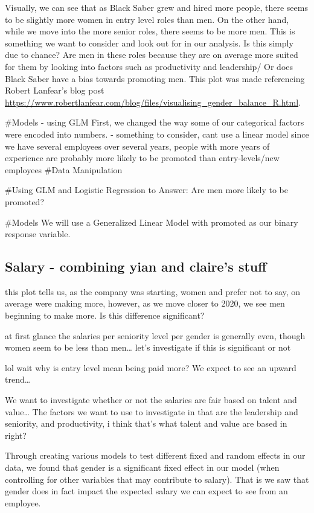 \documentclass[
          english,
          paper=a4,
              ,captions=tableheading
  ]{scrartcl}
\begin{document}
Visually, we can see that as Black Saber grew and hired more people,
there seems to be slightly more women in entry level roles than men. On
the other hand, while we move into the more senior roles, there seems to
be more men. This is something we want to consider and look out for in
our analysis. Is this simply due to chance? Are men in these roles
because they are on average more suited for them by looking into factors
such as productivity and leadership/ Or does Black Saber have a bias
towards promoting men. This plot was made referencing Robert Lanfear's
blog post
\url{https://www.robertlanfear.com/blog/files/visualising_gender_balance_R.html}.

\#Models - using GLM First, we changed the way some of our categorical
factors were encoded into numbers. - something to consider, cant use a
linear model since we have several employees over several years, people
with more years of experience are probably more likely to be promoted
than entry-levels/new employees \#Data Manipulation

\#Using GLM and Logistic Regression to Answer: Are men more likely to be
promoted?

\#Models We will use a Generalized Linear Model with promoted as our
binary response variable.

\hypertarget{salary---combining-yian-and-claires-stuff}{%
\subsection{Salary - combining yian and claire's
stuff}\label{salary---combining-yian-and-claires-stuff}}

this plot tells us, as the company was starting, women and prefer not to
say, on average were making more, however, as we move closer to 2020, we
see men beginning to make more. Is this difference significant?

at first glance the salaries per seniority level per gender is generally
even, though women seem to be less than men\ldots{} let's investigate if
this is significant or not

lol wait why is entry level mean being paid more? We expect to see an
upward trend\ldots{}

We want to investigate whether or not the salaries are fair based on
talent and value\ldots{} The factors we want to use to investigate in
that are the leadership and seniority, and productivity, i think that's
what talent and value are based in right?

Through creating various models to test different fixed and random
effects in our data, we found that gender is a significant fixed effect
in our model (when controlling for other variables that may contribute
to salary). That is we saw that gender does in fact impact the expected
salary we can expect to see from an employee.
\end{document}
